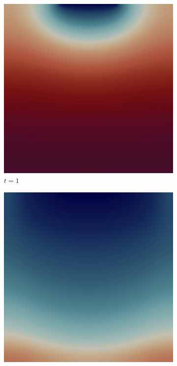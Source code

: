 \vfill\pagebreak

\begin{figure}[H]
    \centering
    \caption{Unit Square with Single Sink: State Solution}
    \begin{subfigure}{.4\textwidth}
        \includegraphics[width=\textwidth]{imgs/UnitSquare1_State/first.png}
        \caption{$t = 1$}
    \end{subfigure}
    \begin{subfigure}{.4\textwidth}
        \includegraphics[width=\textwidth]{imgs/UnitSquare1_State/second.png}

\end{subfigure}
\end{figure}
